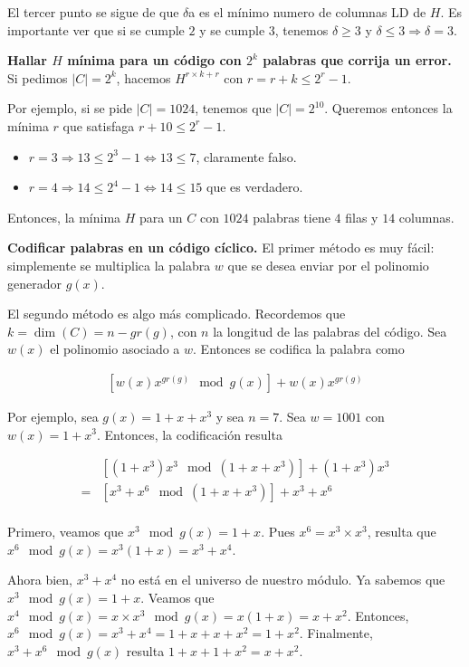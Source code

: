 \documentclass[a4paper]{article}
\begin{document}
El tercer punto se sigue de que $\delta$a es el mínimo numero de columnas LD de
$H$. Es importante ver que si se cumple $2$ y se cumple $3$, tenemos $\delta
\geq 3$ y $\delta \leq 3 \Rightarrow \delta = 3$.

\textbf{Hallar $H$ mínima para un código con $2^k$ palabras que corrija un
error.} Si pedimos $|C| = 2^k$, hacemos $H^{r\times k+r}$ con $r = r + k \leq
2^r - 1$. 

Por ejemplo, si se pide $|C| = 1024$, tenemos que $|C| = 2^{10}$. Queremos entonces la mínima $r$ que satisfaga $r + 10 \leq 2^r - 1$.

\begin{itemize}
    \item $r = 3 \Rightarrow 13 \leq 2^3 - 1 \iff 13 \leq 7$, claramente falso.
    \item $r = 4 \Rightarrow 14 \leq 2^4 - 1 \iff 14 \leq 15$ que es verdadero.
\end{itemize}

Entonces, la mínima $H$ para un $C$ con $1024$ palabras tiene $4$ filas y $14$ columnas.

\textbf{Codificar palabras en un código cíclico.} El primer método es muy fácil:
simplemente se multiplica la palabra $w$ que se desea enviar por el polinomio
generador $g(x)$. 

El segundo método es algo más complicado. Recordemos que $k = \dim(C) = n -
gr(g)$, con $n$ la longitud de las palabras del código. Sea $w(x)$ el polinomio
asociado a $w$. Entonces se codifica la palabra como 

\begin{align*}
    \left[w(x) x^{gr(g)} \mod g(x)\right] + w(x) x^{gr(g)}
\end{align*}

Por ejemplo, sea $g(x) = 1 + x + x^3$ y sea $n = 7$. Sea $w = 1001$ con $w(x) =
1 + x^3$. Entonces, la codificación resulta 

\begin{align*}
    &\left[(1+x^3)x^3 \mod (1 + x + x^3)\right] + (1+x^3)x^3 \\ 
    =&\left[x^3 + x^6 \mod (1 + x + x^3)\right] + x^3 + x^6 \\ 
\end{align*}

Primero, veamos que $x^3 \mod g(x) = 1 + x$. Pues $x^6 = x^3 \times x^3$,
resulta que $x^6 \mod g(x) = x^3 \left( 1 + x \right)  = x^3 + x^4$. 

Ahora bien, $x^3 + x^4$
no está en el universo de nuestro módulo. Ya sabemos que $x^3 \mod g(x) = 1 +
x$. Veamos que $x^4 \mod g(x) = x \times x^3
\mod g(x) = x(1 + x) = x + x^2$.  Entonces, $x^6 \mod g(x) = x^3 + x^4 = 1 + x +
x + x^2 = 1 + x^2$. Finalmente, $x^3 + x^6
\mod g(x)$ resulta $1 + x + 1 + x^2 = x + x^2$.
\end{document}
